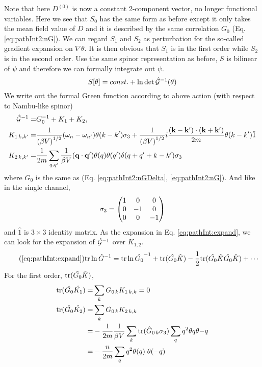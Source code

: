 Note that here $D^{(0)}$ is now a constant 2-component vector, no longer functional variables.  Here we see that $S_{0}$ has the same form as before except it only takes the mean field value of $D$ and it is described by the same correlation $G_{0}$ (Eq. \ref{eq:pathInt2:nG}).  We can regard $S_{1}$ and $S_{2}$ as perturbation for the so-called gradient expansion on $\nabla\theta$.  It is then obvious that $S_{1}$ is in the first order while $S_{2}$ is in the second order.  Use the same spinor representation as before, $S$ is bilinear of $\psi$ and therefore we can formally integrate out $\psi$. 
\begin{equation}
S[\theta]=const.+\ln\det\hat{\mathcal{G}}^{-1}(\theta)
\end{equation}
 We write out the formal Green function according to above action (with respect to Nambu-like spinor)
\begin{subequations}
\begin{align}
\hat{\mathcal{G}}^{-1}=&G_{0}^{-1}+K_{1}+K_{2},\\
K_{1\, k,k'}=
	&\frac{1}{({\beta{}V)}^{1/2}}(\omega_n-\omega_{n'})\theta(k-k')\sigma_3+
		\frac{1}{{(\beta{}V)}^{1/2}}i\frac{(\mathbf{k}-\mathbf{k}')\cdot(\mathbf{k}+\mathbf{k}')}{2m}\theta(k-k')\hat{1}\\
K_{2\, k,k'}=
	&\frac{1}{2m}\sum_{q,q'}\frac{1}{{\beta{}V}}(\mathbf{q}\cdot\mathbf{q}')\theta(q)\theta(q')\delta(q+q'+k-k')\sigma_3
\end{align}
\end{subequations}
where $G_{0}$ is the same as (Eq. \eqref{eq:pathInt2:nGDelta}, \eqref{eq:pathInt2:nG}).  And like in the single channel, 
\begin{equation}
\sigma_3=\begin{pmatrix}1&0&0\\0&-1&0\\0&0&-1\end{pmatrix}
\end{equation}
and $\hat{1}$ is $3\times3$ identity matrix.  As the expansion in Eq. \ref{eq:pathInt:expand}, we can look for the expansion of $\hat{\mathcal{G}}^{-1}$ over $K_{1,2}$.  
\begin{equation}\tag{\ref{eq:pathInt:expand}}
\tr\ln \hat{G}^{-1}=\tr\ln\hat{G_{0}}^{-1}+\tr(\hat{G_{0}}\hat{K})-\nth{2}\tr(\hat{G_{0}}\hat{K}\hat{G_{0}}\hat{K})+\cdots
\end{equation}
For the first order, $\text{tr}(\hat{G_{0}}\hat{K})$, 
\begin{align}
\text{tr}(\hat{G_{0}}\hat{K_1})=&\sum_{k}{G_{0\,k}K_{1\,k,k}}=0\\
\text{tr}(\hat{G_{0}}\hat{K_2})=&\sum_{k}{G_{0\,k}K_{2\,k,k}}\nonumber\\
	=&-\frac{1}{2m}\frac{1}{{\beta{}V}}\sum_{k}\text{tr}(\hat{G}_{0\,k}\sigma_3)\sum_{q}q^2\theta{q}\theta{-q}\nonumber\\
	=&-\frac{n}{2m}\sum_{q}q^2\theta{(q)}\;\theta{(-q)}
\end{align}
